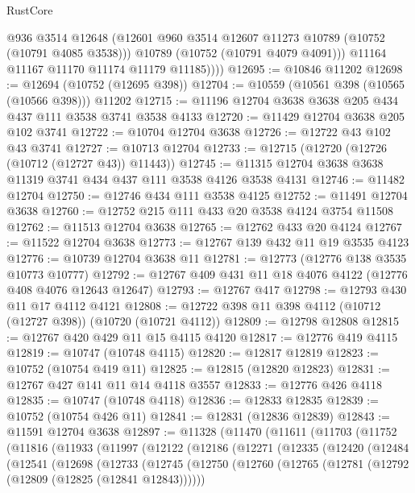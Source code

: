 \begin{lexlean}{RustCore}
\begin{coremodule}
              @936
              @3514
              @12648
              (@12601 @960 @3514 @12607 @11273 @10789 (@10752 (@10791 @4085 @3538)))
              @10789
              (@10752 (@10791 @4079 @4091)))
            @11164
            @11167
            @11170
            @11174
            @11179
            @11185))))
@12695 := @10846 @11202
@12698 := @12694 (@10752 (@12695 @398))
@12704 := @10559 (@10561 @398 (@10565 (@10566 @398))) @11202
@12715 := @11196 @12704 @3638 @3638 @205 @434 @437 @111 @3538 @3741 @3538 @4133
@12720 := @11429 @12704 @3638 @205 @102 @3741
@12722 := @10704 @12704 @3638
@12726 := @12722 @43 @102 @43 @3741
@12727 := @10713 @12704
@12733 := @12715 (@12720 (@12726 (@10712 (@12727 @43)) @11443))
@12745 := @11315 @12704 @3638 @3638 @11319 @3741 @434 @437 @111 @3538 @4126 @3538 @4131
@12746 := @11482 @12704
@12750 := @12746 @434 @111 @3538 @4125
@12752 := @11491 @12704 @3638
@12760 := @12752 @215 @111 @433 @20 @3538 @4124 @3754 @11508
@12762 := @11513 @12704 @3638
@12765 := @12762 @433 @20 @4124
@12767 := @11522 @12704 @3638
@12773 := @12767 @139 @432 @11 @19 @3535 @4123
@12776 := @10739 @12704 @3638 @11
@12781 := @12773 (@12776 @138 @3535 @10773 @10777)
@12792 := @12767 @409 @431 @11 @18 @4076 @4122 (@12776 @408 @4076 @12643 @12647)
@12793 := @12767 @417
@12798 := @12793 @430 @11 @17 @4112 @4121
@12808 := @12722 @398 @11 @398 @4112 (@10712 (@12727 @398)) (@10720 (@10721 @4112))
@12809 := @12798 @12808
@12815 := @12767 @420 @429 @11 @15 @4115 @4120
@12817 := @12776 @419 @4115
@12819 := @10747 (@10748 @4115)
@12820 := @12817 @12819
@12823 := @10752 (@10754 @419 @11)
@12825 := @12815 (@12820 @12823)
@12831 := @12767 @427 @141 @11 @14 @4118 @3557
@12833 := @12776 @426 @4118
@12835 := @10747 (@10748 @4118)
@12836 := @12833 @12835
@12839 := @10752 (@10754 @426 @11)
@12841 := @12831 (@12836 @12839)
@12843 := @11591 @12704 @3638
@12897 := @11328
    (@11470
      (@11611
        (@11703
          (@11752
            (@11816
              (@11933
                (@11997
                  (@12122
                    (@12186
                      (@12271
                        (@12335
                          (@12420
                            (@12484
                              (@12541
                                (@12698
                                  (@12733
                                    (@12745
                                      (@12750
                                        (@12760
                                          (@12765
                                            (@12781 (@12792 (@12809 (@12825 (@12841 @12843))))))

\end{coremodule}
\end{lexlean}
